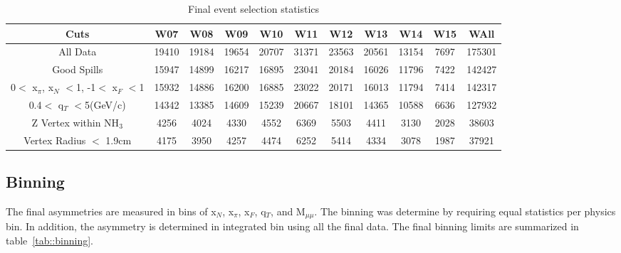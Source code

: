 \begin{table}[h!t]
  \centering
  \begin{tabular}{ |c|c|c|c|c|c|c|c|c|c|c| }
    \hline \textbf{Cuts}& \textbf{W07}& \textbf{W08}& \textbf{W09}&
    \textbf{W10}& \textbf{W11}& \textbf{W12}& \textbf{W13}& \textbf{W14}&
    \textbf{W15} & \textbf{WAll} \\ \hline

    All Data& 19410& 19184& 19654& 20707& 31371& 23563& 20561& 13154& 7697&
    175301 \\ \hline
    
    Good Spills& 15947& 14899& 16217& 16895& 23041& 20184& 16026& 11796& 7422&
    142427 \\ \hline

    0$<$ x$_{\pi}$, x$_N$ $<$1, -1$<$ x$_F$ $<$1& 15932& 14886& 16200& 16885&
    23022& 20171& 16013& 11794& 7414& 142317 \\ \hline

    0.4$<$ q$_T$ $<$5(GeV/c)& 14342& 13385& 14609& 15239& 20667& 18101& 14365&
    10588& 6636& 127932 \\ \hline

    Z Vertex within NH$_3$& 4256& 4024& 4330& 4552& 6369& 5503& 4411& 3130&
    2028& 38603 \\ \hline

    Vertex Radius $<$ 1.9cm& 4175& 3950& 4257& 4474& 6252& 5414& 4334& 3078&
    1987& 37921 \\ \hline
             
  \end{tabular}
  \caption{Final event selection statistics}
  \label{tab::EventTable}
\end{table}

\subsection{Binning}
The final asymmetries are measured in bins of x$_N$, x$_{\pi}$, x$_F$, q$_T$,
and M$_{\mu\mu}$.  The binning was determine by requiring equal statistics per
physics bin.  In addition, the asymmetry is determined in integrated bin using
all the final data.  The final binning limits are summarized in
table~\ref{tab::binning}.

